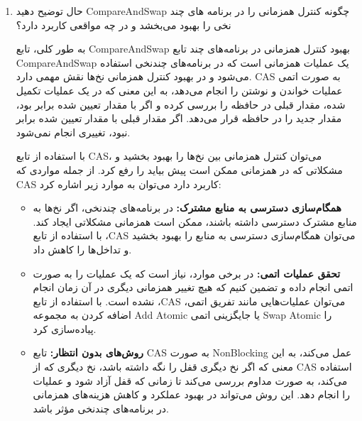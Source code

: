 \begin{enumerate}
\item حال توضیح دهید CompareAndSwap چگونه کنترل همزمانی را در برنامه های چند نخی را بهبود می‌بخشد و در چه مواقعی کاربرد دارد؟


\begin{qsolve}
به طور کلی، تابع CompareAndSwap بهبود کنترل همزمانی در برنامه‌های چند تابع CompareAndSwap یک عملیات همزمانی است که در برنامه‌های چندنخی استفاده می‌شود و در بهبود کنترل همزمانی نخ‌ها نقش مهمی دارد. CAS به صورت اتمی عملیات خواندن و نوشتن را انجام می‌دهد، به این معنی که در یک عملیات تکمیل شده، مقدار قبلی در حافظه را بررسی کرده و اگر با مقدار تعیین شده برابر بود، مقدار جدید را در حافظه قرار می‌دهد. اگر مقدار قبلی با مقدار تعیین شده برابر نبود، تغییری انجام نمی‌شود.

با استفاده از تابع CAS، می‌توان کنترل همزمانی بین نخ‌ها را بهبود بخشید و مشکلاتی که در همزمانی ممکن است پیش بیاید را رفع کرد. از جمله مواردی که CAS کاربرد دارد می‌توان به موارد زیر اشاره کرد:

\begin{itemize}
	\item \textbf{همگام‌سازی دسترسی به منابع مشترک: }در برنامه‌های چندنخی، اگر نخ‌ها به منابع مشترک دسترسی داشته باشند، ممکن است همزمانی مشکلاتی ایجاد کند. با استفاده از تابع ،CAS می‌توان همگام‌سازی دسترسی به منابع را بهبود بخشید و تداخل‌ها را کاهش داد.
	
	\item \textbf{تحقق عملیات اتمی: }در برخی موارد، نیاز است که یک عملیات را به صورت اتمی انجام داده و تضمین کنیم که هیچ تغییر همزمانی دیگری در آن زمان انجام نشده است. با استفاده از تابع ،CAS می‌توان عملیات‌هایی مانند تفریق اتمی، اضافه کردن به مجموعه Add Atomic یا جایگزینی اتمی Swap Atomic را پیاده‌سازی کرد.
	
	\item \textbf{روش‌های بدون انتظار:} تابع CAS به صورت NonBlocking عمل می‌کند، به این معنی که اگر نخ دیگری قفل را نگه داشته باشد، نخ دیگری که از CAS استفاده می‌کند، به صورت مداوم بررسی می‌کند تا زمانی که قفل آزاد شود و عملیات را انجام دهد. این روش می‌تواند در بهبود عملکرد و کاهش هزینه‌های همزمانی در برنامه‌های چندنخی مؤثر باشد.
\end{itemize}

\end{qsolve}

\end{enumerate}